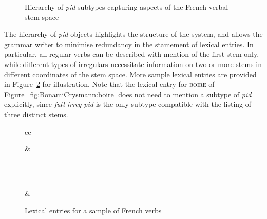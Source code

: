 \documentclass[output=paper]{langsci/langscibook}
\begin{document}
\begin{figure}[htb]
\centering\smaller
{}
\begin{avmtree}
\itshape
{}
\end{avmtree}
\caption{Hierarchy of \emph{pid} subtypes capturing aspects of the French verbal stem space\label{fig:BonamiCrysmann:hier:fr}}
\end{figure}



The hierarchy of \textit{pid} objects highlights the structure of the
system, and allows the grammar writer to minimise redundancy in the
stamement of lexical entries. In particular, all regular verbs can be
described with mention of the first stem only, while different types
of irregulars necessitate information on two or more stems in
different coordinates of the stem space. More sample lexical entries
are provided in Figure~\ref{fig:BonamiCrysmann:more:le} for illustration. Note that
the lexical entry for \textsc{boire} of Figure~\ref{fig:BonamiCrysmann:boire} does
not need to mention  a subtype of \emph{pid} explicitly, since
\emph{full-irreg-pid} is the only subtype compatible with the listing
of three distinct stems.

\begin{figure}[htb]
\centering\smaller
\begin{tabular}{cc}
&
\\ \\
&
\end{tabular}
\caption{Lexical entries for  a sample of French verbs\label{fig:BonamiCrysmann:more:le}}
\end{figure}
\end{document}
